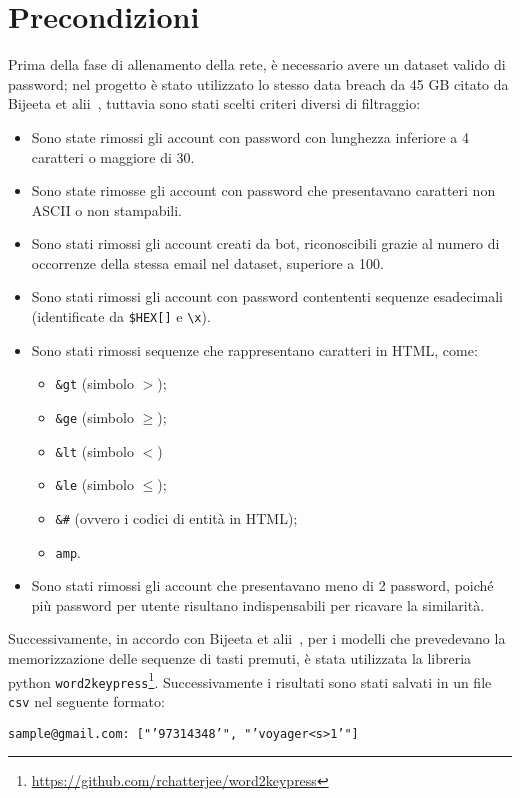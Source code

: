 \section{Precondizioni}
\label{sec:precondizioni}
Prima della fase di allenamento della rete, è necessario avere un dataset valido di password; nel progetto è stato utilizzato lo stesso data breach da 45 GB citato da Bijeeta et alii~\cite{biijeta}, tuttavia sono stati scelti criteri diversi di filtraggio:
\begin{itemize}
    \item Sono state rimossi gli account con password con lunghezza inferiore a 4 caratteri o maggiore di 30.
    \item Sono state rimosse gli account con password che presentavano caratteri non ASCII o non stampabili.
    \item Sono stati rimossi gli account creati da bot, riconoscibili grazie al numero di occorrenze della stessa email nel dataset, superiore a 100.
    \item Sono stati rimossi gli account con password contententi sequenze esadecimali (identificate da \texttt{\$HEX[]} e \texttt{\textbackslash x}).
    \item Sono stati rimossi sequenze che rappresentano caratteri in HTML, come:
    \begin{itemize}
        \item \texttt{\&gt} (simbolo $>$);
        \item \texttt{\&ge} (simbolo $\geq$);
        \item \texttt{\&lt} (simbolo $<$)
        \item \texttt{\&le} (simbolo $\leq$);
        \item \texttt{\&\#} (ovvero i codici di entità in HTML);
        \item \texttt{amp}.
    \end{itemize}
    \item Sono stati rimossi gli account che presentavano meno di 2 password, poiché più password per utente risultano indispensabili per ricavare la similarità.
\end{itemize}
Successivamente, in accordo con Bijeeta et alii~\cite{biijeta}, per i modelli che prevedevano la memorizzazione delle sequenze di tasti premuti, è stata utilizzata la libreria python \texttt{word2keypress}\footnote{\url{https://github.com/rchatterjee/word2keypress}}.
Successivamente i risultati sono stati salvati in un file \texttt{csv} nel seguente formato:
\begin{center}
    \texttt{sample@gmail.com: ["'97314348'", "'voyager<s>1'"]}
\end{center}

